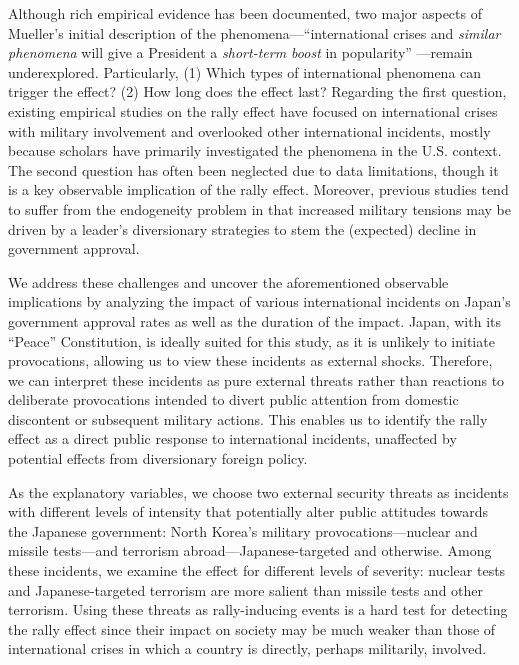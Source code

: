 \documentclass[letterpaper,12pt]{scrartcl}
\begin{document}
Although rich empirical evidence has been documented, two major aspects of Mueller's initial description of the phenomena---``international crises and \textit{similar phenomena} will give a President a \textit{short-term boost} in popularity'' \citep[][p.~20; emphasis added by authors]{Mueller1970APSR}---remain underexplored. Particularly, (1) Which types of international phenomena can trigger the effect? (2) How long does the effect last? Regarding the first question, existing empirical studies on the rally effect have focused on international crises with military involvement and overlooked other international incidents, mostly because scholars have primarily investigated the phenomena in the U.S. context. The second question has often been neglected due to data limitations, though it is a key observable implication of the rally effect. Moreover, previous studies tend to suffer from the endogeneity problem in that increased military tensions may be driven by a leader's diversionary strategies to stem the (expected) decline in government approval.

We address these challenges and uncover the aforementioned observable implications by analyzing the impact of various international incidents on Japan's government approval rates as well as the duration of the impact. Japan, with its ``Peace'' Constitution, is ideally suited for this study, as it is unlikely to initiate provocations, allowing us to view these incidents as external shocks. Therefore, we can interpret these incidents as pure external threats rather than reactions to deliberate provocations intended to divert public attention from domestic discontent or subsequent military actions. This enables us to identify the rally effect as a direct public response to international incidents, unaffected by potential effects from diversionary foreign policy.

As the explanatory variables, we choose two external security threats as incidents with different levels of intensity that potentially alter public attitudes towards the Japanese government: North Korea's military provocations---nuclear and missile tests---and terrorism abroad---Japanese-targeted and otherwise. Among these incidents, we examine the effect for different levels of severity: nuclear tests and Japanese-targeted terrorism are more salient than missile tests and other terrorism. Using these threats as rally-inducing events is a hard test for detecting the rally effect since their impact on society may be much weaker than those of international crises in which a country is directly, perhaps militarily, involved.
\end{document}
